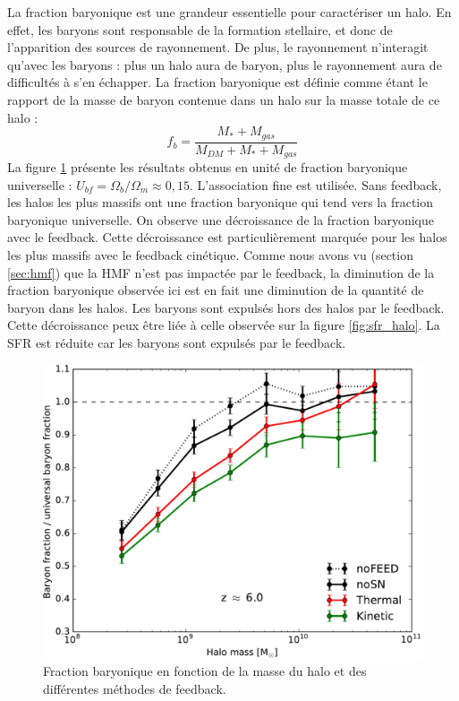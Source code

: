 La fraction baryonique est une grandeur essentielle pour caractériser un halo.
En effet, les baryons sont responsable de la formation stellaire, et donc de l'apparition des sources de rayonnement.
De plus, le rayonnement n'interagit qu'avec les baryons : plus un halo aura de baryon, plus le rayonnement aura de difficultés à s'en échapper.
La fraction baryonique est définie comme étant le rapport de la masse de baryon contenue dans un halo sur la masse totale de ce halo : 
\begin{equation}
f_b = \frac{M_* + M_{gas} }{M_{DM} + M_* + M_{gas} }
\end{equation}
La figure \ref{fig:bfrac} présente les résultats obtenus en unité de fraction baryonique universelle : $U_{bf}= \Omega_b/\Omega_m \approx 0,15$.
L'association fine est utilisée.
Sans feedback, les halos les plus massifs ont une fraction baryonique qui tend vers la fraction baryonique universelle.
On observe une décroissance de la fraction baryonique avec le feedback.
Cette décroissance est particulièrement marquée pour les halos les plus massifs avec le feedback cinétique.
Comme nous avons vu (section \ref{sec:hmf}) que la \ac{HMF} n'est pas impactée par le feedback, la diminution de la fraction baryonique observée ici est en fait une diminution de la quantité de baryon dans les halos.
Les baryons sont expulsés hors des halos par le feedback.
Cette décroissance peux être liée à celle observée sur la figure \ref{fig:sfr_halo}.
La \ac{SFR} est réduite car les baryons sont expulsés par le feedback.




\begin{figure}
		\includegraphics[width=.95\linewidth]{img/03/baryon_frac.pdf}
        \caption[Fraction baryonique]{Fraction baryonique en fonction de la masse du halo et des différentes méthodes de feedback.
 		\label{fig:bfrac}}
\end{figure}


